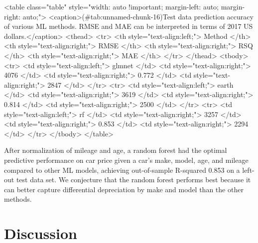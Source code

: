 \begin{Schunk}
\end{Schunk}

\begin{Schunk}
<table class="table" style="width: auto !important; margin-left: auto; margin-right: auto;">
<caption>(\#tab:unnamed-chunk-16)Test data prediction accuracy of various ML methods. RMSE and MAE can be interpreted in terms of 2017 US dollars.</caption>
 <thead>
  <tr>
   <th style="text-align:left;"> Method </th>
   <th style="text-align:right;"> RMSE </th>
   <th style="text-align:right;"> RSQ </th>
   <th style="text-align:right;"> MAE </th>
  </tr>
 </thead>
<tbody>
  <tr>
   <td style="text-align:left;"> glmnet </td>
   <td style="text-align:right;"> 4076 </td>
   <td style="text-align:right;"> 0.772 </td>
   <td style="text-align:right;"> 2847 </td>
  </tr>
  <tr>
   <td style="text-align:left;"> earth </td>
   <td style="text-align:right;"> 3619 </td>
   <td style="text-align:right;"> 0.814 </td>
   <td style="text-align:right;"> 2500 </td>
  </tr>
  <tr>
   <td style="text-align:left;"> rf </td>
   <td style="text-align:right;"> 3257 </td>
   <td style="text-align:right;"> 0.853 </td>
   <td style="text-align:right;"> 2294 </td>
  </tr>
</tbody>
</table>

\end{Schunk}

After normalization of mileage and age, a random forest had the optimal
predictive performance on car price given a car's make, model, age, and
mileage compared to other ML models, achieving out-of-sample R-squared
0.853 on a left-out test data set. We conjecture that the random forest
performs best because it can better capture differential depreciation by
make and model than the other methods.

\hypertarget{discussion}{%
\section{Discussion}\label{discussion}}

